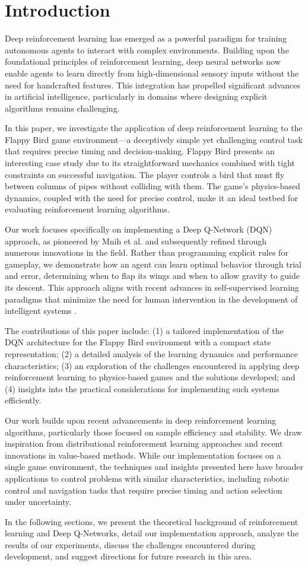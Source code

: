 \section{Introduction}

Deep reinforcement learning has emerged as a powerful paradigm for training autonomous agents to interact with complex environments. Building upon the foundational principles of reinforcement learning, deep neural networks now enable agents to learn directly from high-dimensional sensory inputs without the need for handcrafted features. This integration has propelled significant advances in artificial intelligence, particularly in domains where designing explicit algorithms remains challenging.

In this paper, we investigate the application of deep reinforcement learning to the Flappy Bird game environment—a deceptively simple yet challenging control task that requires precise timing and decision-making. Flappy Bird presents an interesting case study due to its straightforward mechanics combined with tight constraints on successful navigation. The player controls a bird that must fly between columns of pipes without colliding with them. The game's physics-based dynamics, coupled with the need for precise control, make it an ideal testbed for evaluating reinforcement learning algorithms.

Our work focuses specifically on implementing a Deep Q-Network (DQN) approach, as pioneered by Mnih et al. \cite{mnih2015human} and subsequently refined through numerous innovations in the field. Rather than programming explicit rules for gameplay, we demonstrate how an agent can learn optimal behavior through trial and error, determining when to flap its wings and when to allow gravity to guide its descent. This approach aligns with recent advances in self-supervised learning paradigms that minimize the need for human intervention in the development of intelligent systems \cite{hafner2023mastering}.

The contributions of this paper include: (1) a tailored implementation of the DQN architecture for the Flappy Bird environment with a compact state representation; (2) a detailed analysis of the learning dynamics and performance characteristics; (3) an exploration of the challenges encountered in applying deep reinforcement learning to physics-based games and the solutions developed; and (4) insights into the practical considerations for implementing such systems efficiently.

Our work builds upon recent advancements in deep reinforcement learning algorithms, particularly those focused on sample efficiency and stability. We draw inspiration from distributional reinforcement learning approaches \cite{dabney2020distributional} and recent innovations in value-based methods. While our implementation focuses on a single game environment, the techniques and insights presented here have broader applications to control problems with similar characteristics, including robotic control and navigation tasks that require precise timing and action selection under uncertainty.

In the following sections, we present the theoretical background of reinforcement learning and Deep Q-Networks, detail our implementation approach, analyze the results of our experiments, discuss the challenges encountered during development, and suggest directions for future research in this area.